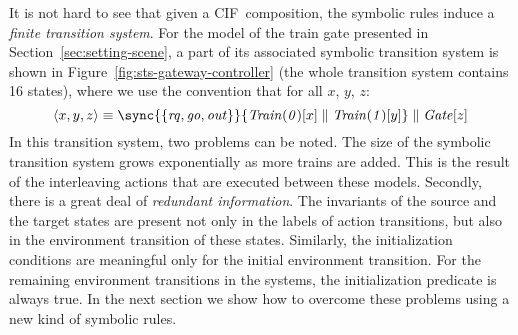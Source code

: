 \documentclass[submission,copyright,creativecommons,sharealike]{eptcs}
\newcommand{\CIF}{{CIF}}
\newcommand{\sstate}[1]{\ensuremath{\langle #1 \rangle}}
\begin{document}
It is not hard to see that given a \CIF\ composition, the symbolic
rules induce a \emph{finite transition system}. For the model of the
train gate presented in Section~\ref{sec:setting-scene}, a part of its
associated symbolic transition system is shown in
Figure~\ref{fig:sts-gateway-controller} (the whole transition system
contains 16 states), where we use the convention that for all $x$,
$y$, $z$:
\begin{equation*}
  \sstate{x, y, z} \equiv \sync{\{\mathit{rq}, \mathit{go},
    \mathit{out}\}}{\mathit{Train(0)}[x] \parallel
    \mathit{Train(1)}[y]} \parallel \mathit{Gate}[z]
\end{equation*}
In this transition system, two problems can be noted. The size of the
symbolic transition system grows exponentially as more trains are
added. This is the result of the interleaving actions that are
executed between these models.
Secondly, there is a great deal of \emph{redundant information}. The
invariants of the source and the target states are present not only in
the labels of action transitions, but also in the environment
transition of these
states. Similarly, the initialization conditions are meaningful only
for the initial environment transition. For the remaining environment
transitions in the systems, the initialization predicate is always
true. In the next section we show how to overcome these
problems using a new kind of symbolic rules.
\end{document}
